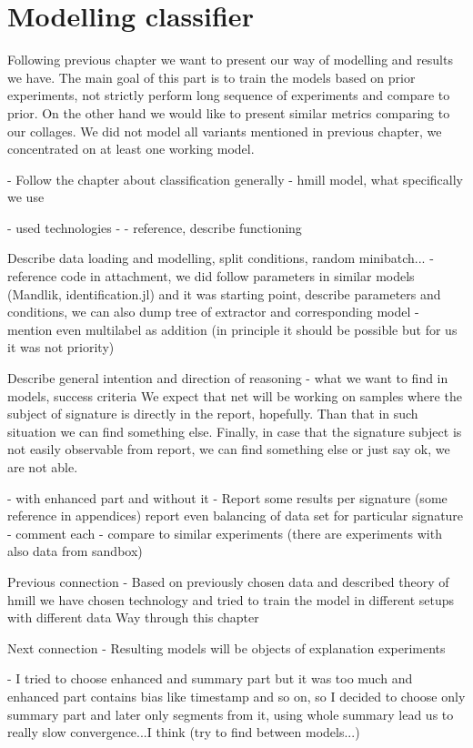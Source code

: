 \chapter{Modelling classifier}
Following previous chapter we want to present our way of modelling and results we have. The main goal of this part is to train the models based on prior experiments, not strictly perform long sequence of experiments and compare to prior. On the other hand we would like to present similar metrics comparing to our collages. We did not model all variants mentioned in previous chapter, we concentrated on at least one working model. 

- Follow the chapter about classification generally - hmill model, what specifically we use

- used technologies
  - 
  - reference, describe functioning

Describe data loading and modelling, split conditions, random minibatch... - reference code in attachment, we did follow parameters in similar models (Mandlik, identification.jl) and it was starting point, describe parameters and conditions, we can also dump tree of extractor and corresponding model
  - mention even multilabel as addition (in principle it should be possible but for us it was not priority)

Describe general intention and direction of reasoning - what we want to find in models, success criteria
We expect that net will be working on samples where the subject of signature is directly in the report, hopefully. Than that in such situation we can find something else. Finally, in case that the signature subject is not easily observable from report, we can find something else or just say ok, we are not able.

- with enhanced part and without it
  - Report some results per signature (some reference in appendices) report even balancing of data set for particular signature
  - comment each
  - compare to similar experiments (there are experiments with also data from sandbox)



Previous connection
- Based on previously chosen data and described theory of hmill we have chosen technology and tried to train the model in different setups with different data
Way through this chapter

Next connection
- Resulting models will be objects of explanation experiments


- I tried to choose enhanced and summary part but it was too much and enhanced part contains bias like timestamp and so on, so I decided to choose only summary part and later only segments from it, using whole summary lead us to really slow convergence...I think (try to find between models...)


